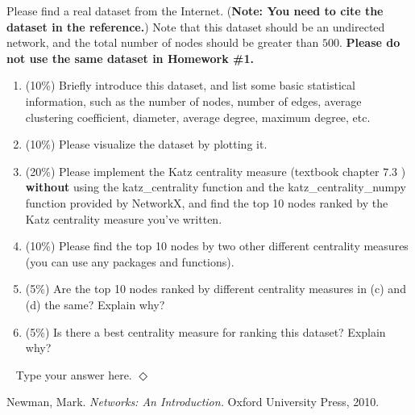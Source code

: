 \documentclass[12pt]{article}
\newcommand {\bsolution}{\noindent {\em Solution:} \ }
\newcommand{\esolution}{\hfill $\Diamond$ \\ \vspace{.3cm}}
\begin{document}
\newpage
Please find a real dataset from the Internet. ({\bf Note: You need to cite the dataset in the reference.}) Note that this dataset should be an undirected network, and the total number of nodes should be greater than $500$. {\bf Please do not use the same dataset in Homework \#1.}

\begin{enumerate}[label=(\alph*)]
	\item (10\%) Briefly introduce this dataset, and list some basic statistical information, such as the number of nodes, number of edges, average clustering coefficient, diameter, average degree, maximum degree, etc.
	\item (10\%) Please visualize the dataset by plotting it. 
	\item (20\%) Please implement the Katz centrality measure (textbook chapter $7.3$ \cite{newman2010networks}) {\bf without} using the katz\_centrality function and the katz\_centrality\_numpy function provided by NetworkX, and find the top 10 nodes ranked by the Katz centrality measure you've written.
	\item (10\%) Please find the top 10 nodes by two other different centrality measures (you can use any packages and functions).
	\item (5\%) Are the top 10 nodes ranked by different centrality measures in (c) and (d) the same? Explain why?
	\item (5\%) Is there a best centrality measure for ranking this dataset? Explain why?
\end{enumerate}

\bsolution
Type your answer here.
\esolution


\begin{thebibliography}{9}
 Newman, Mark. \emph{Networks: An Introduction.} Oxford University Press, 2010.
\end{thebibliography}
\end{document}

